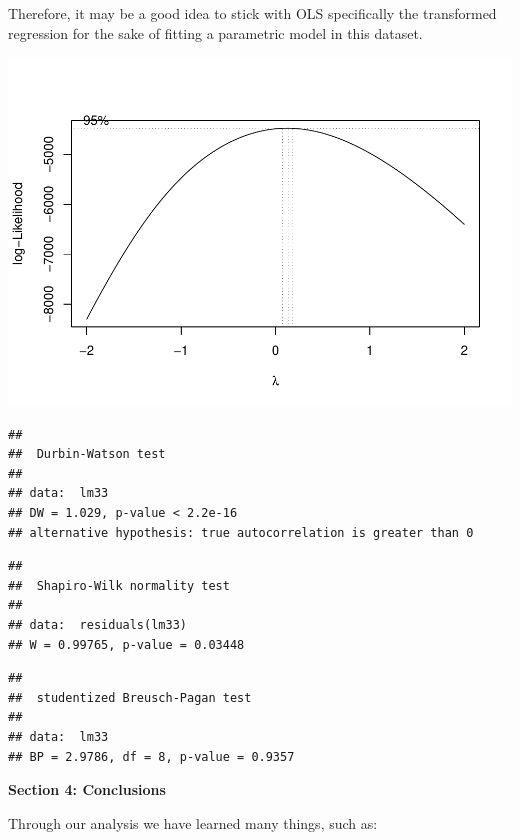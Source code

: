 \documentclass[
]{article}
\begin{document}
Therefore, it may be a good idea to stick with OLS specifically the
transformed regression for the sake of fitting a parametric model in
this dataset.

\includegraphics{Final_Project_2_files/figure-latex/unnamed-chunk-16-1.pdf}

\begin{verbatim}
## 
##  Durbin-Watson test
## 
## data:  lm33
## DW = 1.029, p-value < 2.2e-16
## alternative hypothesis: true autocorrelation is greater than 0
\end{verbatim}

\begin{verbatim}
## 
##  Shapiro-Wilk normality test
## 
## data:  residuals(lm33)
## W = 0.99765, p-value = 0.03448
\end{verbatim}

\begin{verbatim}
## 
##  studentized Breusch-Pagan test
## 
## data:  lm33
## BP = 2.9786, df = 8, p-value = 0.9357
\end{verbatim}

\textbf{Section 4: Conclusions}

Through our analysis we have learned many things, such as:
\end{document}
